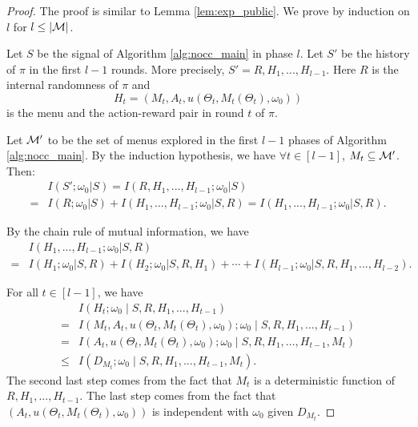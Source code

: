 \begin{proof}
The proof is similar to Lemma \ref{lem:exp_public}. We prove by induction on $l$ for $l \leq |\mathcal{M}|$.


Let $S$ be the signal of Algorithm \ref{alg:nocc_main} in phase $l$. Let $S'$ be the history of $\pi$ in the first $l-1$ rounds. More precisely, $S' = R, H_1,...,H_{l-1}$. Here $R$ is the internal randomness of $\pi$ and
\[ H_t = (M_t, A_t,u(\Theta_t, M_t(\Theta_t), \omega_0))\]
is the menu and the action-reward pair in round $t$ of $\pi$.

Let $\mathcal{M}'$ to be the set of menus explored in the first $l-1$ phases of Algorithm \ref{alg:nocc_main}. By the induction hypothesis, we have $\forall t\in[l-1]$, $M_t \subseteq \mathcal{M}'$. Then:
\begin{align*}
&I(S'; \omega_0| S) = I(R,H_1,...,H_{l-1}; \omega_0| S)  \\
= &I(R; \omega_0| S) + I(H_1,...,H_{l-1}; \omega_0|S, R) = I(H_1,...,H_{l-1}; \omega_0|S, R).
\end{align*}

By the chain rule of mutual information, we have
\begin{align*}
& I(H_1,...,H_{l-1}; \omega_0|S, R) \\
 =& I(H_1;\omega_0|S,R) + I(H_2;\omega_0|S, R ,H_1) + \cdots + I(H_{l-1}; \omega_0|S,R,H_1,...,H_{l-2}).
\end{align*}

For all $t \in [l-1]$, we have
\begin{align*}
&I(H_t; \omega_0 \mid S,R,H_1,...,H_{t-1}) \\
=& I(M_t,A_t, u(\Theta_t, M_t(\Theta_t), \omega_0); \omega_0 \mid S,R,H_1,...,H_{t-1}) \\
=& I(A_t, u(\Theta_t, M_t(\Theta_t), \omega_0); \omega_0  \mid  S,R,H_1,...,H_{t-1}, M_t)\\
\leq& I(D_{M_t}; \omega_0 \mid S,R,H_1,...,H_{t-1},M_t).
\end{align*}
The second last step comes from the fact that $M_t$ is a deterministic function of $R,H_1,...,H_{t-1}$. The last step comes from the fact that $(A_t,u(\Theta_t, M_t(\Theta_t), \omega_0))$ is independent with $\omega_0$ given $D_{M_t}$.


\end{proof}
